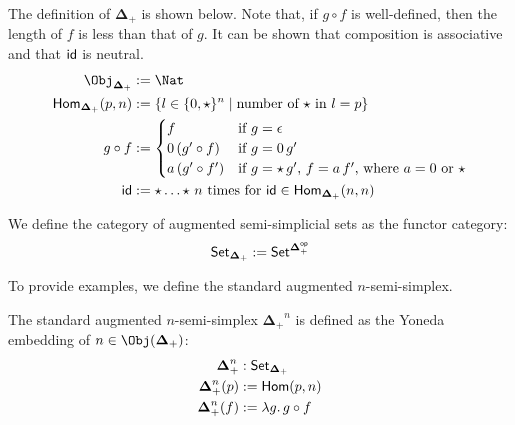 \documentclass{msc}
\newcommand{\DeltaPlus}{\ensuremath{\boldsymbol{\Delta}_+}}
\newcommand{\kstar}{{\star}}
\begin{document}
\begin{definition}[$\DeltaPlus$]
  The definition of $\DeltaPlus$ is shown below. Note that, if $g \circ f$ is well-defined, then the length of $f$ is less than that of $g$. It can be shown that composition is associative and that $\mathsf{id}$ is neutral.
  \begin{align*}
    \Obj_{\DeltaPlus}       & := \Nat                                                                             \\
    \Hom_{\DeltaPlus}(p, n) & := \{l \in \{0, \kstar\}^n \mid \text{number of $\kstar$ in $l = p$}\}              \\
    g \circ f               & :=
    \begin{cases}
      f                  & \text{if $g = \epsilon$}                                                        \\
      0\,(g' \circ f)  & \text{if $g = 0\,g'$}                                                 \\
      a\,(g' \circ f') & \text{if $g = \kstar\,g'$, $f = a\,f'$, where $a = 0$ or $\kstar$} \\
    \end{cases}                \\
    \id                     & := \kstar \ldots \kstar \text{ $n$ times for $\id \in \Hom_{\DeltaPlus}(n, n)$}
  \end{align*}
\end{definition}

\begin{definition}[$\Set_{\DeltaPlus}$]
  We define the category of augmented semi-simplicial sets as the functor category:
  \begin{equation*}
    \Set_{\DeltaPlus} := \Set^{\DeltaPlus^{\mathsf{op}}}
  \end{equation*}
\end{definition}

To provide examples, we define the standard augmented $n$-semi-simplex.

\begin{definition}[$\DeltaPlus^n$]
  The standard augmented $n$-semi-simplex $\DeltaPlus^n$ is defined as the Yoneda embedding of $n \in \Obj(\DeltaPlus)$:
  \begin{align*}
    \DeltaPlus^n    & : \Set_{\DeltaPlus}        \\
    \DeltaPlus^n(p) & := \Hom(p, n)              \\
    \DeltaPlus^n(f) & := \lambda g .\, g \circ f
  \end{align*}
\end{definition}
\end{document}
